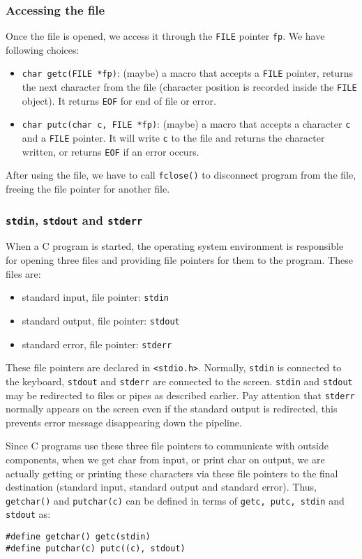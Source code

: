 \documentclass[12pt]{article}
\begin{document}
\subsubsection{Accessing the file}
\label{sec:org6bdf6fe}
Once the file is opened, we access it through the \texttt{FILE} pointer \texttt{fp}. We have following choices:
\begin{itemize}
\item \texttt{char getc(FILE *fp)}: (maybe) a macro that accepts a \texttt{FILE} pointer, returns the next character from the file (character position is recorded inside the \texttt{FILE} object). It returns \texttt{EOF} for end of file or error.
\item \texttt{char putc(char c, FILE *fp)}: (maybe) a macro that accepts a character \texttt{c} and a \texttt{FILE} pointer. It will write \texttt{c} to the file and returns the character written, or returns \texttt{EOF} if an error occurs.
\end{itemize}

After using the file, we have to call \texttt{fclose()} to disconnect program from the file, freeing the file pointer for another file.

\subsubsection{\texttt{stdin}, \texttt{stdout} and \texttt{stderr}}
\label{sec:orgf2684ff}
When a C program is started, the operating system environment is responsible for opening three files and providing file pointers for them to the program. These files are:
\begin{itemize}
\item standard input, file pointer: \texttt{stdin}
\item standard output, file pointer: \texttt{stdout}
\item standard error, file pointer: \texttt{stderr}
\end{itemize}
These file pointers are declared in \texttt{<stdio.h>}. Normally, \texttt{stdin} is connected to the keyboard, \texttt{stdout} and \texttt{stderr} are connected to the screen. \texttt{stdin} and \texttt{stdout} may be redirected to files or pipes as described earlier. Pay attention that \texttt{stderr} normally appears on the screen even if the standard output is redirected, this prevents error message disappearing down the pipeline. 

Since C programs use these three file pointers to communicate with outside components, when we get char from input, or print char on output, we are actually getting or printing these characters via these file pointers to the final destination (standard input, standard output and standard error). Thus, \texttt{getchar()} and \texttt{putchar(c)} can be defined in terms of \texttt{getc, putc, stdin} and \texttt{stdout} as:
\begin{verbatim}
#define getchar() getc(stdin)
#define putchar(c) putc((c), stdout)
\end{verbatim}
\end{document}
